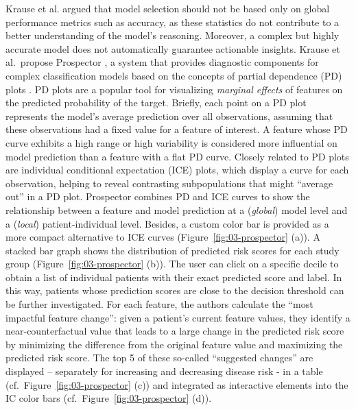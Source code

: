 \documentclass[
  oneside]{book}
\begin{document}
Krause et al. \autocite{Krause:Prospector2016} argued that model selection should not be based only on global performance metrics such as accuracy, as these statistics do not contribute to a better understanding of the model's reasoning.
Moreover, a complex but highly accurate model does not automatically guarantee actionable insights.
Krause et al.~propose Prospector \autocite{Krause:Prospector2016}, a system that provides diagnostic components for complex classification models based on the concepts of partial dependence (PD) plots \autocite{Friedman:PDP2001}.
PD plots are a popular tool for visualizing \emph{marginal effects} of features on the predicted probability of the target.
Briefly, each point on a PD plot represents the model's average prediction over all observations, assuming that these observations had a fixed value for a feature of interest.
A feature whose PD curve exhibits a high range or high variability is considered more influential on model prediction than a feature with a flat PD curve.
Closely related to PD plots are individual conditional expectation (ICE) plots, \autocite{Goldstein:ICE2015} which display a curve for each observation, helping to reveal contrasting subpopulations that might ``average out'' in a PD plot.
Prospector combines PD and ICE curves to show the relationship between a feature and model prediction at a (\emph{global}) model level and a (\emph{local}) patient-individual level.
Besides, a custom color bar is provided as a more compact alternative to ICE curves (Figure~\ref{fig:03-prospector} (a)).
A stacked bar graph shows the distribution of predicted risk scores for each study group (Figure~\ref{fig:03-prospector} (b)).
The user can click on a specific decile to obtain a list of individual patients with their exact predicted score and label.
In this way, patients whose prediction scores are close to the decision threshold can be further investigated.
For each feature, the authors calculate the ``most impactful feature change'': given a patient's current feature values, they identify a near-counterfactual value that leads to a large change in the predicted risk score by minimizing the difference from the original feature value and maximizing the predicted risk score.
The top 5 of these so-called ``suggested changes'' are displayed -- separately for increasing and decreasing disease risk - in a table (cf.~Figure~\ref{fig:03-prospector} (c)) and integrated as interactive elements into the IC color bars (cf.~Figure~\ref{fig:03-prospector} (d)).
\end{document}
